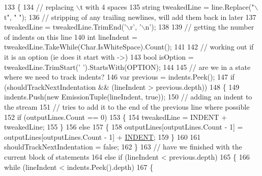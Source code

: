 \begin{DoxyCode}
133                 \{
134                     \textcolor{comment}{// replacing \(\backslash\)t with 4 spaces}
135                     \textcolor{keywordtype}{string} tweakedLine = line.Replace(\textcolor{stringliteral}{"\(\backslash\)t"}, \textcolor{stringliteral}{"    "});
136                     \textcolor{comment}{// stripping of any trailing newlines, will add them back in later}
137                     tweakedLine = tweakedLine.TrimEnd(\textcolor{charliteral}{'\(\backslash\)r'}, \textcolor{charliteral}{'\(\backslash\)n'});
138 
139                     \textcolor{comment}{// getting the number of indents on this line}
140                     \textcolor{keywordtype}{int} lineIndent = tweakedLine.TakeWhile(Char.IsWhiteSpace).Count();
141 
142                     \textcolor{comment}{// working out if it is an option (ie does it start with ->)}
143                     \textcolor{keywordtype}{bool} isOption = tweakedLine.TrimStart(\textcolor{charliteral}{' '}).StartsWith(OPTION);
144 
145                     \textcolor{comment}{// are we in a state where we need to track indents?}
146                     var previous = indents.Peek();
147                     \textcolor{keywordflow}{if} (shouldTrackNextIndentation && (lineIndent > previous.depth))
148                     \{
149                         indents.Push(\textcolor{keyword}{new} EmissionTuple(lineIndent, \textcolor{keyword}{true}));
150                         \textcolor{comment}{// adding an indent to the stream}
151                         \textcolor{comment}{// tries to add it to the end of the previous line where possible}
152                         \textcolor{keywordflow}{if} (outputLines.Count == 0)
153                         \{
154                             tweakedLine = INDENT + tweakedLine;
155                         \}
156                         \textcolor{keywordflow}{else}
157                         \{
158                             outputLines[outputLines.Count - 1] = outputLines[outputLines.Count - 1] + 
      \hyperlink{a00330_ae3f2190a793ab77428838e58e0e83676}{INDENT};
159                         \}
160 
161                         shouldTrackNextIndentation = \textcolor{keyword}{false};
162                     \}
163                     \textcolor{comment}{// have we finished with the current block of statements}
164                     \textcolor{keywordflow}{else} \textcolor{keywordflow}{if} (lineIndent < previous.depth)
165                     \{
166                         \textcolor{keywordflow}{while} (lineIndent < indents.Peek().depth)
167                         \{

\end{DoxyCode}
